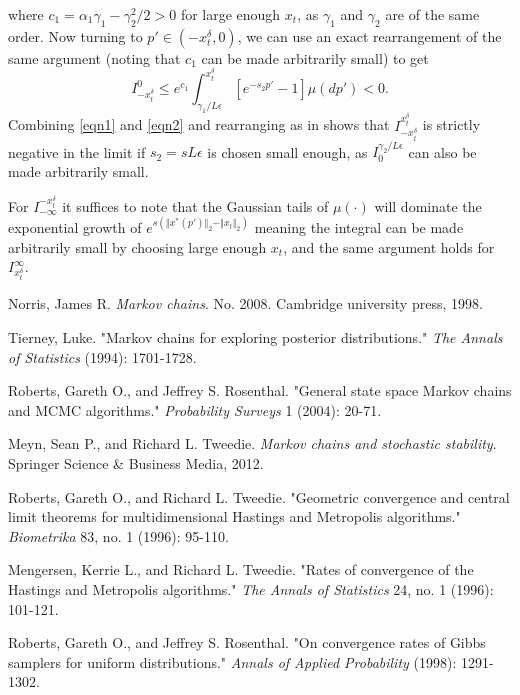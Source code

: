 \documentclass{article}
\begin{document}
where $c_{1}=\alpha_{1}\gamma_{1}-\gamma_{2}^{2}/2>0$ for large enough
$x_{t}$, as $\gamma_{1}$ and $\gamma_{2}$ are of the same order.
Now turning to $p'\in(-x_{t}^{\delta},0)$, we can use an exact rearrangement
of the same argument (noting that $c_{1}$ can be made arbitrarily
small) to get 
\begin{equation}
I_{-x_{t}^{\delta}}^{0}\leq e^{c_{1}}\int_{\gamma_{1}/L\epsilon}^{x_{t}^{\delta}}[e^{-s_{2}p'}-1]\mu(dp')<0.\label{eqn2}
\end{equation}
Combining \eqref{eqn1} and \eqref{eqn2} and rearranging as in \cite[Theorem 3.2]{mengersen1996rates}
shows that $I_{-x_{t}^{\delta}}^{x_{t}^{\delta}}$ is strictly negative
in the limit if $s_{2}=sL\epsilon$ is chosen small enough, as $I_{0}^{\gamma_{2}/L\epsilon}$
can also be made arbitrarily small.

For $I_{-\infty}^{-x_{t}^{\delta}}$ it suffices to note that the
Gaussian tails of $\mu(\cdot)$ will dominate the exponential growth
of $e^{s(\Vert x^{*}(p')\Vert_{2}-\Vert x_{t}\Vert_{2})}$ meaning
the integral can be made arbitrarily small by choosing large enough
$x_{t}$, and the same argument holds for $I_{x_{t}^{\delta}}^{\infty}$.

\begin{thebibliography}{1}

   Norris, James R. \emph{Markov chains}. No. 2008. Cambridge university press, 1998.

    Tierney, Luke. "Markov chains for exploring posterior distributions." \emph{The Annals of Statistics} (1994): 1701-1728.

   Roberts, Gareth O., and Jeffrey S. Rosenthal. "General state space Markov chains and MCMC algorithms." \emph{Probability Surveys} 1 (2004): 20-71.

   Meyn, Sean P., and Richard L. Tweedie. \emph{Markov chains and stochastic stability}. Springer Science \& Business Media, 2012.
  
   Roberts, Gareth O., and Richard L. Tweedie. "Geometric convergence and central limit theorems for multidimensional Hastings and Metropolis algorithms." \emph{Biometrika} 83, no. 1 (1996): 95-110.
  
   Mengersen, Kerrie L., and Richard L. Tweedie. "Rates of convergence of the Hastings and Metropolis algorithms." \emph{The Annals of Statistics} 24, no. 1 (1996): 101-121.
  
   Roberts, Gareth O., and Jeffrey S. Rosenthal. "On convergence rates of Gibbs samplers for uniform distributions." \emph{Annals of Applied Probability} (1998): 1291-1302.

  \end{thebibliography}
\end{document}
